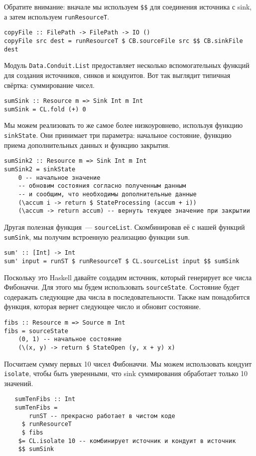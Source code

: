 Обратите внимание: вначале мы используем \verb=$$= для соединения источника с sink, а
затем используем \lstinline=runResourceT=.
\begin{lstlisting}
copyFile :: FilePath -> FilePath -> IO ()
copyFile src dest = runResourceT $ CB.sourceFile src $$ CB.sinkFile dest
\end{lstlisting}
Модуль \lstinline=Data.Conduit.List= предоставляет несколько вспомогательных функций для создания
источников, синков и кондуитов. Вот так выглядит типичная свёртка: суммирование чисел.
\begin{lstlisting}
sumSink :: Resource m => Sink Int m Int
sumSink = CL.fold (+) 0
\end{lstlisting}
Мы можем реализовать то же самое более низкоуровнево, используя функцию \verb=sinkState=.
Они принимает три параметра: начальное состояние, функцию приема дополнительных данных и функцию закрытия.
\begin{lstlisting}
sumSink2 :: Resource m => Sink Int m Int
sumSink2 = sinkState
    0 -- начальное значение
    -- обновим состояния согласно полученным данным 
    -- и сообщим, что необходимы дополнительные данные
    (\accum i -> return $ StateProcessing (accum + i))
    (\accum -> return accum) -- вернуть текущее значение при закрытии
\end{lstlisting}
Другая полезная функция~--- \verb=sourceList=. Скомбинировав её с нашей функций
\verb=sumSink=, мы получим встроенную реализацию функции \lstinline=sum=.
\begin{lstlisting}
sum' :: [Int] -> Int
sum' input = runST $ runResourceT $ CL.sourceList input $$ sumSink
\end{lstlisting}
Поскольку это Haskell давайте создадим источник, который генерирует все числа Фибоначчи.
Для этого мы будем использовать \lstinline=sourceState=. Состояние будет содеражать
следующие два
числа в последовательности. Также нам понадобится функция, которая вернет следующее число
и обновит состояние.
\begin{lstlisting}
fibs :: Resource m => Source m Int
fibs = sourceState
    (0, 1) -- начальное состояние
    (\(x, y) -> return $ StateOpen (y, x + y) x)
\end{lstlisting}
Посчитаем сумму первых 10 чисел Фибоначчи. Мы можем использовать кондуит \lstinline=isolate=,
чтобы быть уверенными, что sink суммирования обработает только 10 значений.
\begin{lstlisting}
   sumTenFibs :: Int
   sumTenFibs =
       runST -- прекрасно работает в чистом коде
     $ runResourceT
     $ fibs
    $= CL.isolate 10 -- комбинирует источник и кондуит в источник
    $$ sumSink
\end{lstlisting}
